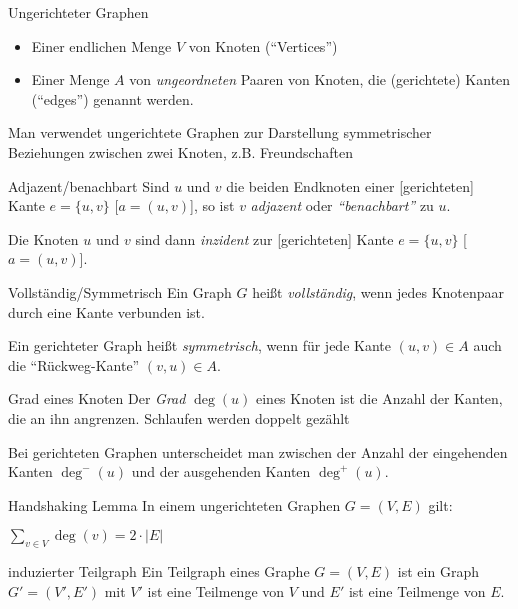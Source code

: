\documentclass{panikzettel}
\begin{document}
{\begin{halfboxr}
\begin{defi}{Ungerichteter Graphen}
		\begin{itemize}
			\item Einer endlichen Menge $V$ von Knoten (``Vertices'')
			
			\item Einer Menge $A$ von \emph{ungeordneten} Paaren von Knoten, die (gerichtete) Kanten (``edges'') genannt werden.
		\end{itemize}
	
	Man verwendet ungerichtete Graphen zur Darstellung symmetrischer Beziehungen zwischen zwei Knoten, z.B. Freundschaften
	\end{defi}
\end{halfboxr}

\begin{thirdboxl}
	\vspace{-\baselineskip}	
	\begin{defi}{Adjazent/benachbart}
	Sind $u$ und $v$ die beiden Endknoten einer [gerichteten] Kante $e = \{u,v\}$ [$a= (u,v)$], so ist $v$ \emph{adjazent} oder \emph{``benachbart''} zu $u$.
	
	Die Knoten $u$ und $v$ sind dann \emph{inzident} zur [gerichteten] Kante $e = \{u,v\}$ [$a= (u,v)$].
	\end{defi}

	\begin{defi}{Vollständig/Symmetrisch}
		Ein Graph $G$ heißt \emph{vollständig}, wenn jedes Knotenpaar durch eine Kante verbunden ist.
		
		Ein gerichteter Graph heißt \emph{symmetrisch}, wenn für jede Kante $(u,v) \in A$ auch die ``Rückweg-Kante'' $(v,u) \in A$.
	\end{defi}
\end{thirdboxl}%
\begin{thirdboxm}
	\vspace{-\baselineskip}		
	\begin{defi}{Grad eines Knoten}
		Der \emph{Grad} $\deg (u)$ eines Knoten ist die Anzahl der Kanten, die an ihn angrenzen. Schlaufen werden doppelt gezählt
		
		Bei gerichteten Graphen unterscheidet man zwischen der Anzahl der eingehenden Kanten $\deg ^- (u)$ und der ausgehenden Kanten $\deg ^+ (u)$.
	\end{defi}

	\begin{theo}{Handshaking Lemma}
		In einem ungerichteten Graphen $G = (V,E)$ gilt:
		
		$\sum_{v \in V} \deg (v) = 2 \cdot |E|$
	\end{theo}
\end{thirdboxm}%
\begin{thirdboxr}
	\vspace{-\baselineskip}	
	\begin{defi}{induzierter Teilgraph}
		Ein Teilgraph eines Graphe $G = (V,E)$ ist ein Graph $G' = (V',E')$ mit $V'$ ist eine Teilmenge von $V$ und $E'$ ist eine Teilmenge von $E$. 
		

\end{defi}
\end{thirdboxr}}
\end{document}

